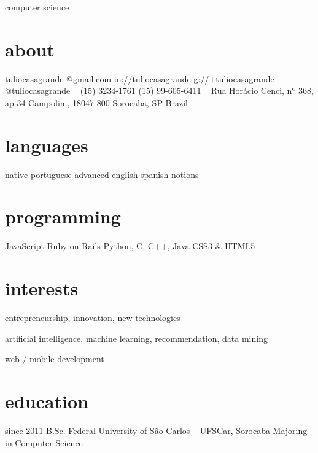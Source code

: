 \documentclass[]{friggeri-cv}
\begin{document}
       {computer science}


\begin{aside}
  \section{about}
    \href{mailto:tuliocasagrande@gmail.com}{tuliocasagrande @gmail.com}
    \href{http://www.linkedin.com/in/tuliocasagrande}{in://tuliocasagrande}
    \href{https://plus.google.com/+tuliocasagrande}{g://+tuliocasagrande}
    \href{https://twitter.com/tuliocasagrande}{@tuliocasagrande}
    ~
    (15) 3234-1761
    (15) 99-605-6411
    ~
    Rua Horácio Cenci,
    nº 368, ap 34
    Campolim, 18047-800
    Sorocaba, SP
    Brazil
  \section{languages}
    native portuguese
    advanced english
    spanish notions
  \section{programming}
    JavaScript
    Ruby on Rails
    Python, C, C++, Java
    CSS3 \& HTML5
\end{aside}

\section{interests}

entrepreneurship, innovation, new technologies

artificial intelligence, machine learning, recommendation, data mining

web / mobile development

\section{education}

\begin{entrylist}
  \entry
    {since 2011}
    {B.Sc.}
    {Federal University of São Carlos -- UFSCar, Sorocaba}
    {Majoring in Computer Science}
\end{entrylist}
\end{document}
